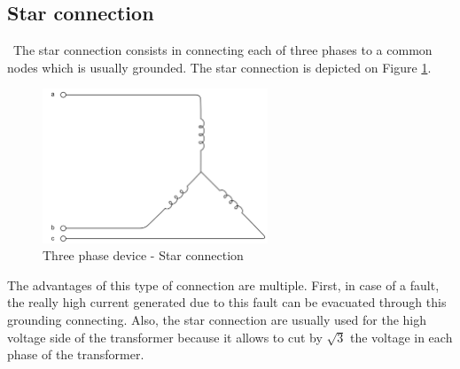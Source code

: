 \documentclass[12pt,a4paper]{report}
\begin{document}
\subsection{Star connection}
\quad\, The star connection consists in connecting each of three phases to a common nodes which is usually grounded. The star connection is depicted on Figure \ref{fig:star}.
\begin{figure}[h]
    \centering
    \includegraphics[width=0.6\textwidth]{star.png}
    \caption{Three phase device - Star connection}
    \label{fig:star}
\end{figure}

The advantages of this type of connection are multiple. First, in case of a fault, the really high current generated due to this fault can be evacuated through this grounding connecting. Also, the star connection are usually used for the high voltage side of the transformer because it allows to cut by $\sqrt{3}$ the voltage in each phase of the transformer.
\end{document}
